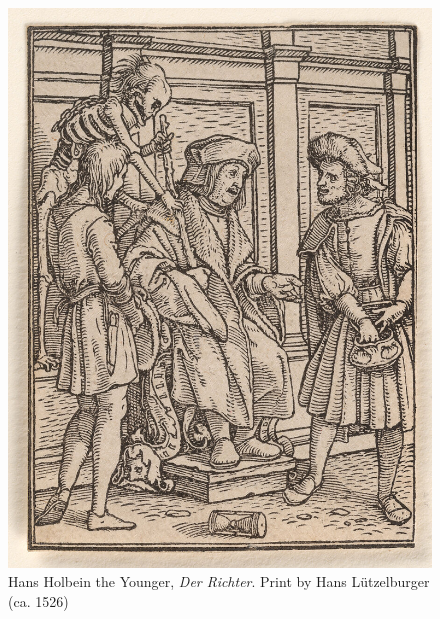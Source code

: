 \color{OffBlack}


{\clearpage}{}

\blankpage

\frontmatter

\thispagestyle{empty}

\begin{figure}
\centering
\includegraphics[width=1\textwidth]{../img/frontispiece.jpg}
\caption{Hans Holbein the Younger,  \textit{Der Richter}. Print by Hans Lützelburger (ca. 1526)}
\end{figure}

\clearpage


\thispagestyle{empty}

